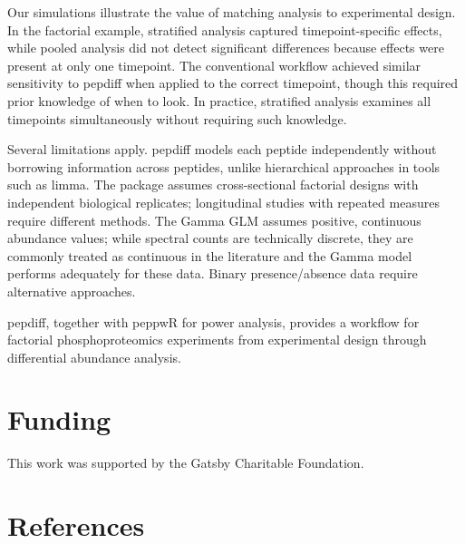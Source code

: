 \documentclass[
]{article}
\begin{document}
Our simulations illustrate the value of matching analysis to
experimental design. In the factorial example, stratified analysis
captured timepoint-specific effects, while pooled analysis did not
detect significant differences because effects were present at only one
timepoint. The conventional workflow achieved similar sensitivity to
pepdiff when applied to the correct timepoint, though this required
prior knowledge of when to look. In practice, stratified analysis
examines all timepoints simultaneously without requiring such knowledge.

Several limitations apply. pepdiff models each peptide independently
without borrowing information across peptides, unlike hierarchical
approaches in tools such as limma. The package assumes cross-sectional
factorial designs with independent biological replicates; longitudinal
studies with repeated measures require different methods. The Gamma GLM
assumes positive, continuous abundance values; while spectral counts are
technically discrete, they are commonly treated as continuous in the
literature and the Gamma model performs adequately for these data.
Binary presence/absence data require alternative approaches.

pepdiff, together with peppwR for power analysis, provides a workflow
for factorial phosphoproteomics experiments from experimental design
through differential abundance analysis.

\section{Funding}\label{funding}

This work was supported by the Gatsby Charitable Foundation.

\section*{References}\label{references}
\end{document}
